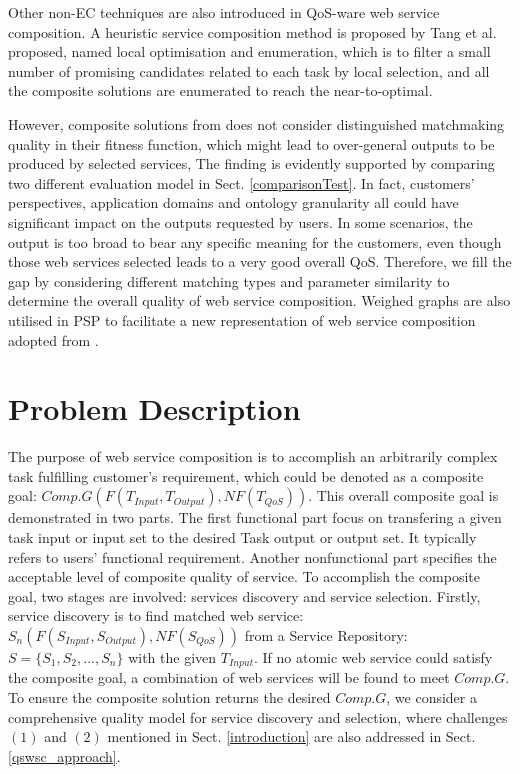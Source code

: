 \documentclass{IEEEtran}
\begin{document}
Other non-EC techniques are also introduced in QoS-ware web service composition. A heuristic service composition method is proposed by Tang et al. \cite{qi2010combining} proposed,  named local optimisation and enumeration, which is to filter a small number of promising candidates related to each task by local selection, and all the composite solutions are enumerated to reach the near-to-optimal. 

However, composite solutions from \cite{qi2010combining,da2016particle,ma2015hybrid,da2015graphevol,yu2013adaptive} does not consider distinguished matchmaking quality in their fitness function, which might lead to over-general outputs to be produced by selected services, The finding is evidently supported by comparing two different evaluation model in Sect. \ref{comparisonTest}. In fact, customers' perspectives, application domains and ontology granularity all could have significant impact on the outputs requested by users. In some scenarios, the output is too broad to bear any specific meaning for the customers, even though those web services selected leads to a very good overall QoS. Therefore, we fill the gap by considering different matching types and parameter similarity to determine the overall quality of web service composition. Weighed graphs are also utilised in PSP to facilitate a new representation of web service composition adopted from \cite{da2016particle}.
\section{Problem Description}\label{problemDes}

The purpose of web service composition is to accomplish an arbitrarily complex task fulfilling customer's requirement, which could be denoted as a composite goal: $Comp.G(F(T_{Input}, T_{Output}), NF(T_{QoS}))$. This overall composite goal is demonstrated in two parts. The first functional part focus on transfering a given task input or input set to the desired Task output or output set. It typically refers to users' functional requirement. Another nonfunctional part specifies the acceptable level of composite quality of service. To accomplish the composite goal, two stages are involved: services discovery and service selection. Firstly, service discovery is to find matched web service: $S_{n}(F(S_{Input}, S_{Output}), NF(S_{QoS}))$ from a Service Repository: $S =  \{S_{1}, S_{2},..., S_{n} \}$ with the given $T_{Input}$. If no atomic web service could satisfy the composite goal, a combination of web services will be found to meet $Comp.G$. To ensure the composite solution returns the desired $Comp.G$, we consider a comprehensive quality model for service discovery and selection, where challenges $(1)$ and $(2)$ mentioned in Sect. \ref{introduction} are also addressed in Sect. \ref{qswsc_approach}.
\end{document}
